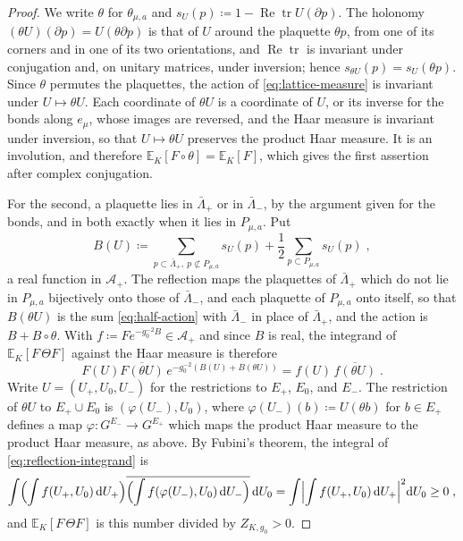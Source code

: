 \documentclass[11pt]{preprint}
\newcommand{\dd}{\mathrm{d}}
\newcommand{\tr}{\operatorname{tr}}
\numberwithin{equation}{section}
\theoremstyle{definition}
\theoremstyle{remark}
\theoremstyle{plain}
\begin{document}
\begin{proof}
We write $\theta$ for $\theta_{\mu,a}$ and $s_U(p) \coloneqq 1 - \operatorname{Re}\tr U(\partial p)$. The holonomy $(\theta U)(\partial p) = U(\theta\partial p)$ is that of $U$ around the plaquette $\theta p$, from one of its corners and in one of its two orientations, and $\operatorname{Re}\tr$ is invariant under conjugation and, on unitary matrices, under inversion; hence $s_{\theta U}(p) = s_U(\theta p)$. Since $\theta$ permutes the plaquettes, the action of \eqref{eq:lattice-measure} is invariant under $U \mapsto \theta U$. Each coordinate of $\theta U$ is a coordinate of $U$, or its inverse for the bonds along $e_\mu$, whose images are reversed, and the Haar measure is invariant under inversion, so that $U \mapsto \theta U$ preserves the product Haar measure. It is an involution, and therefore $\mathbb E_K[F \circ \theta] = \mathbb E_K[F]$, which gives the first assertion after complex conjugation.

For the second, a plaquette lies in $\bar\Lambda_+$ or in $\bar\Lambda_-$, by the argument given for the bonds, and in both exactly when it lies in $P_{\mu,a}$. Put
\begin{equation}\label{eq:half-action}
    B(U) \coloneqq \sum_{p \subset \bar\Lambda_+,\ p \not\subset P_{\mu,a}}s_U(p) + \frac12\sum_{p \subset P_{\mu,a}}s_U(p)\;,
\end{equation}
a real function in $\mathcal A_+$. The reflection maps the plaquettes of $\bar\Lambda_+$ which do not lie in $P_{\mu,a}$ bijectively onto those of $\bar\Lambda_-$, and each plaquette of $P_{\mu,a}$ onto itself, so that $B(\theta U)$ is the sum \eqref{eq:half-action} with $\bar\Lambda_-$ in place of $\bar\Lambda_+$, and the action is $B + B \circ \theta$. With $f \coloneqq Fe^{-g_0^{-2}B} \in \mathcal A_+$ and since $B$ is real, the integrand of $\mathbb E_K[F\,\Theta F]$ against the Haar measure is therefore
\begin{equation}\label{eq:reflection-integrand}
    F(U)\overline{F(\theta U)}\,e^{-g_0^{-2}(B(U) + B(\theta U))} = f(U)\,\overline{f(\theta U)}\;.
\end{equation}
Write $U = (U_+, U_0, U_-)$ for the restrictions to $E_+$, $E_0$, and $E_-$. The restriction of $\theta U$ to $E_+ \cup E_0$ is $(\varphi(U_-), U_0)$, where $\varphi(U_-)(b) \coloneqq U(\theta b)$ for $b \in E_+$ defines a map $\varphi \colon G^{E_-} \to G^{E_+}$ which maps the product Haar measure to the product Haar measure, as above. By Fubini's theorem, the integral of \eqref{eq:reflection-integrand} is
\begin{equation}\label{eq:reflection-square}
    \int\Bigl(\int f(U_+, U_0)\,\dd U_+\Bigr)\overline{\Bigl(\int f(\varphi(U_-), U_0)\,\dd U_-\Bigr)}\,\dd U_0 = \int\Bigl\lvert\int f(U_+, U_0)\,\dd U_+\Bigr\rvert^2\dd U_0 \geq 0\;,
\end{equation}
and $\mathbb E_K[F\,\Theta F]$ is this number divided by $Z_{K,g_0} > 0$.
\end{proof}
\end{document}
